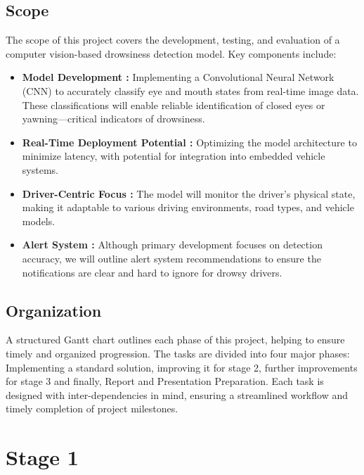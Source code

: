 \documentclass{modeleRapport}
\begin{document}
\subsection{Scope}

The scope of this project covers the development, testing, and evaluation of a computer vision-based drowsiness detection model. Key components include: 

\begin{itemize}

\item \textbf{Model Development :} Implementing a Convolutional Neural Network (CNN) to accurately classify eye and mouth states from real-time image data. These classifications will enable reliable identification of closed eyes or yawning—critical indicators of drowsiness. 

\item \textbf{Real-Time Deployment Potential :} Optimizing the model architecture to minimize latency, with potential for integration into embedded vehicle systems. 

\item \textbf{Driver-Centric Focus :} The model will monitor the driver’s physical state, making it adaptable to various driving environments, road types, and vehicle models. 

\item \textbf{Alert System :} Although primary development focuses on detection accuracy, we will outline alert system recommendations to ensure the notifications are clear and hard to ignore for drowsy drivers. 

\end{itemize}

\subsection{Organization}

A structured Gantt chart outlines each phase of this project, helping to ensure timely and organized progression. The tasks are divided into four major phases: Implementing a standard solution, improving it for stage 2, further improvements for stage 3 and finally, Report and Presentation Preparation. Each task is designed with inter-dependencies in mind, ensuring a streamlined workflow and timely completion of project milestones.


\section{Stage 1}
\end{document}
